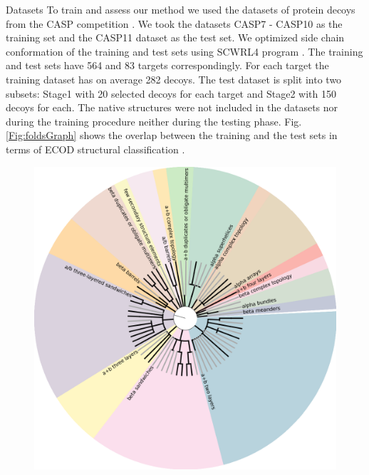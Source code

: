 \documentclass[final, unknownkeysallowed]{beamer}
\begin{document}
\begin{frame}{}
\begin{textblock}{39.0}
\begin{block}{Datasets}
   To train and assess our method we used the datasets of protein decoys from the CASP competition \cite{moult2014critical}. 
We took the datasets CASP7 - CASP10 as the training set and the CASP11 dataset as the test set.
We optimized side chain conformation of the training and test sets using SCWRL4 program \cite{krivov2009improved}.
The training and test sets have 564 and 83 targets correspondingly. For each target the training dataset has 
on average 282 decoys. The test dataset is split into two subsets: Stage1 with 20 selected decoys for each target and Stage2 with 150 decoys
for each. The native structures were not included in the datasets nor during the training procedure
neither during the testing phase. Fig. \ref{Fig:foldsGraph} shows the overlap between the training and the test sets in terms of 
ECOD structural classification \cite{cheng2014ecod}.
\begin{figure}[H]
    \centering
    \includegraphics[width=0.55\linewidth]{../draft/Fig/folds_graph.png}

\end{figure}
\end{block}
\end{textblock}
\end{frame}
\end{document}
